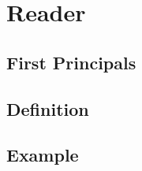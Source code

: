 \section{Reader}
\subsection{First Principals}
\begin{frame}
  
\end{frame}
\subsection{Definition}
\begin{frame}
  
\end{frame}
\subsection{Example}
\begin{frame}
  
\end{frame}
